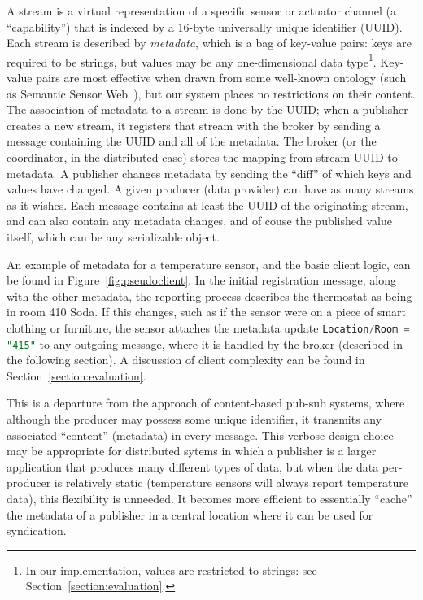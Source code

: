 A stream is a virtual representation of a specific sensor or actuator channel (a ``capability'') that is indexed by a 16-byte universally unique identifier (UUID).
Each stream is described by \emph{metadata}, which is a bag of key-value pairs: keys are required to be strings, but values may be any one-dimensional data type\footnote{In our implementation, values are restricted to strings: see Section~\ref{section:evaluation}.}.
Key-value pairs are most effective when drawn from some well-known ontology (such as Semantic Sensor Web~\cite{sheth2008semantic}), but our system places no restrictions on their content.
The association of metadata to a stream is done by the UUID; when a publisher creates a new stream, it registers that stream with the broker by sending a message containing the UUID and all of the metadata.
The broker (or the coordinator, in the distributed case) stores the mapping from stream UUID to metadata.
A publisher changes metadata by sending the ``diff'' of which keys and values have changed.
A given producer (data provider) can have as many streams as it wishes.
Each message contains at least the UUID of the originating stream, and can also contain any metadata changes, and of couse the published value itself, which can be any serializable object.

An example of metadata for a temperature sensor, and the basic client logic, can be found in Figure~\ref{fig:pseudoclient}.
In the initial registration message, along with the other metadata, the reporting process describes the thermostat as being in room 410 Soda.
If this changes, such as if the sensor were on a piece of smart clothing or furniture, the sensor attaches the metadata update \lstinline[language=SQL,basicstyle=\ttfamily]{Location/Room = "415"} to any outgoing message, where it is handled by the broker (described in the following section).
A discussion of client complexity can be found in Section~\ref{section:evaluation}.

This is a departure from the approach of content-based pub-sub systems, where although the producer may possess some unique identifier, it transmits any associated ``content'' (metadata) in every message.
This verbose design choice may be appropriate for distributed sytems in which a publisher is a larger application that produces many different types of data, but when the data per-producer is relatively static (temperature sensors will always report temperature data), this flexibility is unneeded.
It becomes more efficient to essentially ``cache'' the metadata of a publisher in a central location where it can be used for syndication.

